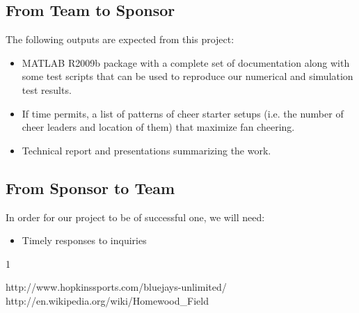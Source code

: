 \documentclass[12pt,letterpaper]{article}
\theoremstyle{definition}
\begin{document}
\subsection{From Team to Sponsor} %
The following outputs are expected from this project:
\begin{itemize}
    \item MATLAB R2009b package with a complete set of documentation along with some test 
        scripts that can be used to reproduce our numerical and simulation test
        results.
    \item If time permits, a list of patterns of cheer starter setups (i.e. the number of cheer leaders and location of them) that maximize fan cheering.
    \item Technical report and presentations summarizing the work. 
\end{itemize}

\subsection{From Sponsor to Team} %

In order for our project to be of successful one, we will need:
\begin{itemize}
    \item Timely responses to inquiries 
\end{itemize}


\newpage
\begin{thebibliography} {1}


 http://www.hopkinssports.com/bluejays-unlimited/
 http://en.wikipedia.org/wiki/Homewood\_Field
%
\end{thebibliography}
\end{document}
